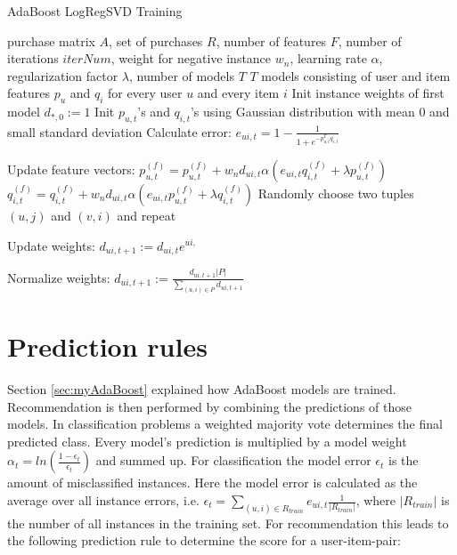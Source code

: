 \documentclass[10pt]{reportMaster}
\begin{document}
\begin{algorithm}
	\caption[AdaBoost LogRegSVD Training]{AdaBoost LogRegSVD Training}
	\label{alg:AdaBoostLogRegSVDTraining}
	\begin{algorithmic}[1]
		\Require purchase matrix $A$, set of purchases $R$, number of features $F$, number of iterations $iterNum$, weight for negative instance $w_n$, learning rate $\alpha$, regularization factor $\lambda$, number of models $T$
		\Ensure $T$ models consisting of user and item features $p_u$ and $q_i$ for every user $u$ and every item $i$
		\State Init instance weights of first model $d_{*,0} := 1$
				\State Init $p_{u,t}$'s and $q_{i,t}$'s using Gaussian distribution with mean $0$ and small standard deviation
					\State Calculate error:
					\State $e_{ui,t} = 1 - \frac{1}{1 + e^{-p_{u,t}^Tq_{i,t}}}$
					
					\State Update feature vectors:
						\State $p_{u,t}^{(f)} = p_{u,t}^{(f)} + w_n d_{ui,t} \alpha (e_{ui, t} q_{i,t}^{(f)} + \lambda p_{u,t}^{(f)})$
						\State $q_{i,t}^{(f)} = q_{i,t}^{(f)} + w_n d_{ui,t} \alpha (e_{ui, t} p_{u,t}^{(f)} + \lambda q_{i,t}^{(f)})$
					\EndFor	
					\State Randomly choose two tuples $(u,j)$ and $(v,i)$ and repeat
				\EndFor
			\EndFor
			
			\State Update weights:
				\State $d_{ui,t+1} := d_{ui,t} e^{ui,}$
			\EndFor
			
			\State Normalize weights:
			\State $d_{ui,t+1} := \frac{d_{ui,t+1} |P|}{\sum_{(u,i) \in P}{d_{ui, t+1}}}$
			\EndFor 
		\EndFor
		
		
	\end{algorithmic}	
\end{algorithm}


\section{Prediction rules}
\label{sec:predictionRules}

Section \ref{sec:myAdaBoost} explained how AdaBoost models are trained.
Recommendation is then performed by combining the predictions of those models.
In classification problems a weighted majority vote determines the final predicted class.
Every model's prediction is multiplied by a model weight $\alpha_t = ln(\frac{1-\epsilon_t}{\epsilon_t})$ and summed up.
For classification the model error $\epsilon_t$ is the amount of misclassified instances.
Here the model error is calculated as the average over all instance errors, i.e. $\epsilon_t = \sum_{(u,i)\in R_{train}}{e_{ui,t}}\frac{1}{|R_{train}|}$, where $|R_{train}|$ is the number of all instances in the training set.
For recommendation this leads to the following prediction rule to determine the score for a user-item-pair:
\end{document}

